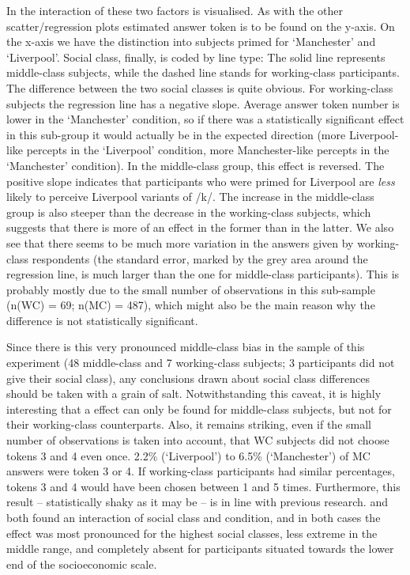 In  the interaction of these two factors is visualised.
As with the other scatter/regression plots estimated answer token is to be found on the y-axis.
On the x-axis we have the distinction into subjects primed for `Manchester' and `Liverpool'.
Social class, finally, is coded by line type: The solid line represents middle-class subjects, while the dashed line stands for working-class participants.
The difference between the two social classes is quite obvious.
For working-class subjects the regression line has a negative slope.
Average answer token number is lower in the `Manchester' condition, so if there was a statistically significant  effect in this sub-group it would actually be in the expected direction (more Liverpool-like percepts in the `Liverpool' condition, more Manchester-like percepts in the `Manchester' condition).
In the middle-class group, this effect is reversed.
The positive slope indicates that participants who were primed for Liverpool are \emph{less} likely to perceive Liverpool variants of /k/.
The increase in the middle-class group is also steeper than the decrease in the working-class subjects, which suggests that there is more of an effect in the former than in the latter.
We also see that there seems to be much more variation in the answers given by working-class respondents (the standard error, marked by the grey area around the regression line, is much larger than the one for middle-class participants).
This is probably mostly due to the small number of observations in this sub-sample (n(WC) = 69; n(MC) = 487), which might also be the main reason why the difference is not statistically significant.

Since there is this very pronounced middle-class bias in the sample of this experiment (48 middle-class and 7 working-class subjects; 3 participants did not give their social class), any conclusions drawn about social class differences should be taken with a grain of salt.
Notwithstanding this caveat, it is highly interesting that a  effect can only be found for middle-class subjects, but not for their working-class counterparts.
Also, it remains striking, even if the small number of observations is taken into account, that WC subjects did not choose tokens 3 and 4 even once.
2.2\% (`Liverpool') to 6.5\% (`Manchester') of MC answers were token 3 or 4.
If working-class participants had similar percentages, tokens 3 and 4 would have been chosen between 1 and 5 times.
Furthermore, this result -- statistically shaky as it may be -- is in line with previous research.
\textcite{hayetal2006a} and \textcite{haydrager2010} both found an interaction of social class and condition, and in both cases the  effect was most pronounced for the highest social classes, less extreme in the middle range, and completely absent for participants situated towards the lower end of the socioeconomic scale.

